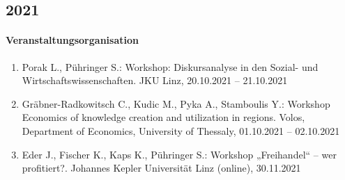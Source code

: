 \subsection*{2021}
\paragraph{Veranstaltungsorganisation}
\begin{enumerate}[leftmargin=*, labelsep=0.5cm]
\item Porak L., Pühringer S.: Workshop: Diskursanalyse in den Sozial- und Wirtschaftswissenschaften. JKU Linz, 20.10.2021 -- 21.10.2021
\item Gräbner-Radkowitsch C., Kudic M., Pyka A., Stamboulis Y.: Workshop Economics of knowledge creation and utilization in regions. Volos, Department of Economics, University of Thessaly, 01.10.2021 -- 02.10.2021
\item Eder J., Fischer K., Kaps K., Pühringer S.: Workshop „Freihandel“ – wer profitiert?. Johannes Kepler Universität Linz (online), 30.11.2021
\end{enumerate}

